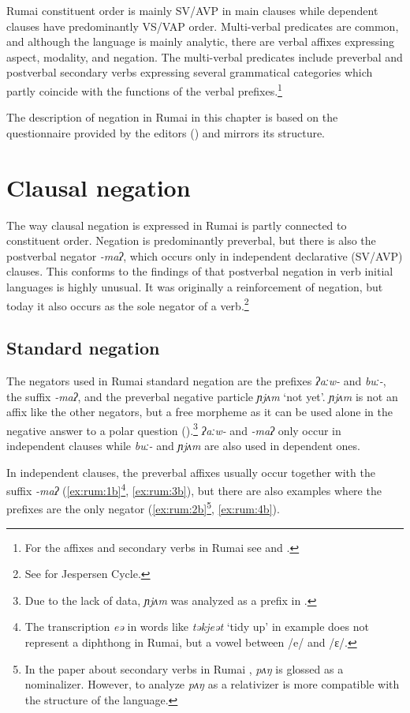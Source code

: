 \documentclass[output=paper,colorlinks,citecolor=brown]{langscibook}
\begin{document}
Rumai constituent order is mainly SV/AVP in main clauses while dependent clauses have predominantly VS/VAP order. Multi-verbal predicates are common, and although the language is mainly analytic, there are verbal affixes expressing aspect, modality, and negation. The multi-verbal predicates include preverbal and postverbal secondary verbs expressing several grammatical categories which partly coincide with the functions of the verbal prefixes.\footnote{For the affixes and secondary verbs in Rumai see \citealt{Weymuth2018} and \citeyear{Weymuth2023}.}

The description of negation in Rumai in this chapter is based on the questionnaire provided by the editors () and mirrors its structure.


\section{Clausal negation} \label{sec:rum:2}

The way clausal negation is expressed in Rumai is partly connected to constituent order. 
Negation is predominantly preverbal, but there is also the postverbal negator \textit{{}-maʔ}, which occurs only in independent declarative (SV/AVP) clauses. 
This conforms to the findings of \citet[97]{Dryer1988} that postverbal negation in verb initial languages is highly unusual.
It was originally a reinforcement of negation, but today it also occurs as the sole negator of a verb.\footnote{See  for Jespersen Cycle.} 

\subsection{Standard negation} \label{sec:rum:2.1}

The negators used in Rumai standard negation are the prefixes \textit{ʔaːw{}-} and \textit{buː{}-}, the suffix \textit{{}-maʔ}, and the preverbal negative particle \textit{ɲjʌm} ‘not yet’. \textit{ɲjʌm} is not an affix like the other negators, but a free morpheme as it can be used alone in the negative answer to a polar question ().\footnote{Due to the lack of data, \textit{ɲjʌm} was analyzed as a prefix in \citet{Weymuth2018}.}
\textit{ʔaːw-} and \textit{{}-maʔ} only occur in independent clauses while \textit{buː-} and \textit{ɲjʌm} are also used in dependent ones.

In independent clauses, the preverbal affixes usually occur together with the suffix \textit{{}-maʔ} (\ref{ex:rum:1b}\footnote{The transcription \textit{eə} in words like \textit{təkjeət} ‘tidy up’ in example  does not represent a diphthong in Rumai, but a vowel between /e/ and /ɛ/.}, \ref{ex:rum:3b}), but there are also examples where the prefixes are the only negator (\ref{ex:rum:2b}\footnote{In the paper about secondary verbs in Rumai \citep{Weymuth2023}, \textit{pʌŋ} is glossed as a nominalizer. However, to analyze \textit{pʌŋ} as a relativizer is more compatible with the structure of the language.}, \ref{ex:rum:4b}).
\end{document}
